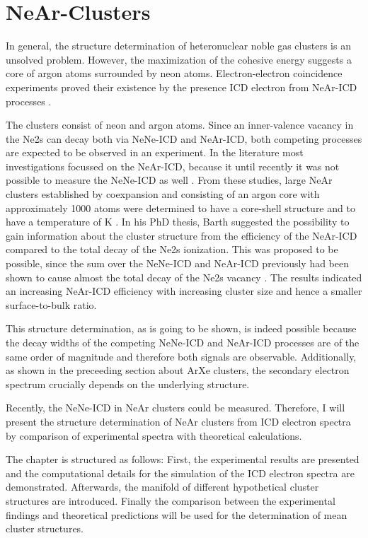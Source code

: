 \section{NeAr-Clusters}

In general, the structure determination of heteronuclear noble gas
clusters is an unsolved problem. However, the maximization of the cohesive
energy suggests a core of argon atoms surrounded by neon atoms.
Electron-electron coincidence experiments proved their existence by the
presence ICD electron from NeAr-ICD processes \cite{}.

The clusters consist of neon and argon atoms. Since an inner-valence vacancy in
the Ne2s can decay both via NeNe-ICD and NeAr-ICD, both competing processes
are expected to be observed in an experiment. In the literature most
investigations focussed on the NeAr-ICD, because it until recently it was not
possible to measure the NeNe-ICD as well \cite{Fasshauer14_1}.
From these studies, large NeAr clusters established by coexpansion and
consisting of an argon core with
approximately 1000 atoms were determined to have a core-shell structure
\cite{xyz06,Lundwall07,Barth_diss}
and to have a temperature of \unit[40 -- 50]{K} \cite{Barth_diss}.
In his PhD thesis, Barth suggested the possibility to gain information about
the cluster structure from the efficiency of the NeAr-ICD compared to the
total decay of the Ne2s ionization. This was proposed to be possible, since
the sum over the NeNe-ICD and NeAr-ICD previously had been shown to
cause almost the total decay of the Ne2s vacancy \cite{Marburgerxy}.
The results indicated an increasing NeAr-ICD efficiency with increasing
cluster size and hence a smaller surface-to-bulk ratio.

This structure determination, as is going to be shown, is indeed possible
because the decay widths of the competing NeNe-ICD and NeAr-ICD processes
are of the same order
of magnitude and therefore both signals are observable. Additionally, as shown
in the preceeding section about ArXe clusters, the secondary electron spectrum
crucially depends on the underlying structure.

Recently, the NeNe-ICD in NeAr clusters could be measured. Therefore, I will
present the structure determination of NeAr clusters from ICD electron
spectra by comparison of experimental spectra with theoretical calculations.

The chapter is structured as follows: First, the experimental results are
presented and the computational details for the simulation of the ICD
electron spectra are demonstrated. Afterwards, the manifold of different 
hypothetical cluster structures are introduced. Finally the comparison
between the experimental findings and theoretical predictions will be used
for the determination of mean cluster structures.


